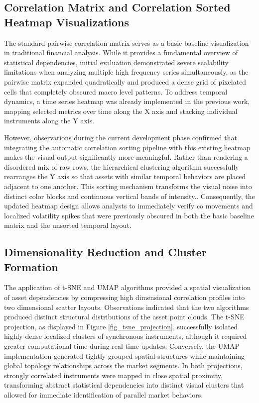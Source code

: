 \documentclass[final,3p,times,twocolumn]{elsarticle}
\begin{document}
\subsection{Correlation Matrix and Correlation Sorted Heatmap Visualizations}\label{sec_heatmap_results}
The standard pairwise correlation matrix serves as a basic baseline visualization in traditional financial analysis. While it provides a fundamental overview of statistical dependencies, initial evaluation demonstrated severe scalability limitations when analyzing multiple high frequency series simultaneously, as the pairwise matrix expanded quadratically and produced a dense grid of pixelated cells that completely obscured macro level patterns. To address temporal dynamics, a time series heatmap was already implemented in the previous work, mapping selected metrics over time along the X axis and stacking individual instruments along the Y axis.

However, observations during the current development phase confirmed that integrating the automatic correlation sorting pipeline with this existing heatmap makes the visual output significantly more meaningful. Rather than rendering a disordered mix of raw rows, the hierarchical clustering algorithm successfully rearranges the Y axis so that assets with similar temporal behaviors are placed adjacent to one another. This sorting mechanism transforms the visual noise into distinct color blocks and continuous vertical bands of intensity.. Consequently, the updated heatmap design allows analysts to immediately verify co movements and localized volatility spikes that were previously obscured in both the basic baseline matrix and the unsorted temporal layout.

\subsection{Dimensionality Reduction and Cluster Formation}\label{sec_dimensionality_results}
The application of t-SNE and UMAP algorithms provided a spatial visualization of asset dependencies by compressing high dimensional correlation profiles into two dimensional scatter layouts. Observations indicated that the two algorithms produced distinct structural distributions of the asset point clouds. The t-SNE projection, as displayed in Figure \ref{fig_tsne_projection}, successfully isolated highly dense localized clusters of synchronous instruments, although it required greater computational time during real time updates. Conversely, the UMAP implementation generated tightly grouped spatial structures while maintaining global topology relationships across the market segments. In both projections, strongly correlated instruments were mapped in close spatial proximity, transforming abstract statistical dependencies into distinct visual clusters that allowed for immediate identification of parallel market behaviors.
\end{document}
